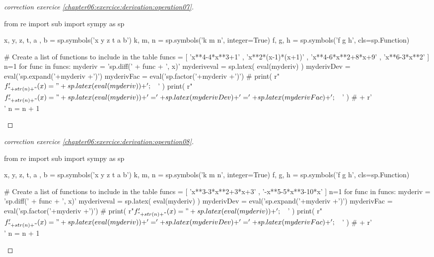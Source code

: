 \documentclass[main.tex]{subfiles}
\begin{document}
\begin{proof}[correction exercice \ref{chapter06:exercice:derivation:operation07}] %
\noindent
\begin{pycode}
from re import sub
import sympy as sp

x, y, z, t, a , b = sp.symbols('x y z t a b')
k, m, n = sp.symbols('k m n', integer=True)
f, g, h = sp.symbols('f g h', cls=sp.Function)

# Create a list of functions to include in the table
funcs = [
'x**4-4*x**3+1'
, 'x**2*(x-1)*(x+1)' 
, 'x**4-6*x**2+8*x+9' 
, 'x**6-3*x**2' 
]
n=1 
for func in funcs: 
	myderiv = 'sp.diff(' + func + ', x)' 
	myderiveval = sp.latex( eval(myderiv) )
	myderivDev =  eval('sp.expand('+myderiv +')')
	myderivFac =  eval('sp.factor('+myderiv +')')  
	#	print(   r"$f'_{"+ str(n)+"}(x)=" + sp.latex( eval(myderiv) ) + '; \quad$' ) 
	print(   r"$f'_{"+ str(n)+"}(x)=" + sp.latex( eval(myderiv) ) + '=' + sp.latex(myderivDev)  + '=' + sp.latex(myderivFac) + '; \quad$' ) 
	# + r'\\' 
	n     = n + 1 
\end{pycode}
\end{proof}
\begin{proof}[correction exercice \ref{chapter06:exercice:derivation:operation08}] %
\noindent
\begin{pycode}
from re import sub
import sympy as sp

x, y, z, t, a , b = sp.symbols('x y z t a b')
k, m, n = sp.symbols('k m n', integer=True)
f, g, h = sp.symbols('f g h', cls=sp.Function)

# Create a list of functions to include in the table
funcs = [
'x**3-3*x**2+3*x+3'
, '-x**5-5*x**3-10*x' 
]
n=1 
for func in funcs: 
	myderiv = 'sp.diff(' + func + ', x)' 
	myderiveval = sp.latex( eval(myderiv) )
	myderivDev =  eval('sp.expand('+myderiv +')')
	myderivFac =  eval('sp.factor('+myderiv +')')  
	#	print(   r"$f'_{"+ str(n)+"}(x)=" + sp.latex( eval(myderiv) ) + '; \quad$' ) 
	print(   r"$f'_{"+ str(n)+"}(x)=" + sp.latex( eval(myderiv) ) + '=' + sp.latex(myderivDev)  + '=' + sp.latex(myderivFac) + '; \quad$' ) 
	# + r'\\' 
	n     = n + 1 
\end{pycode}
\end{proof}
\end{document}
